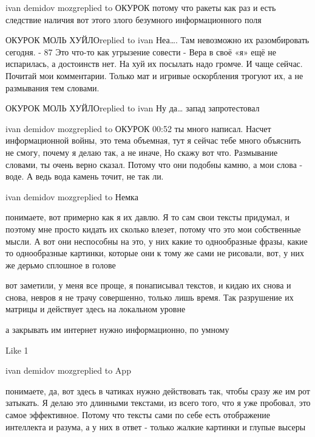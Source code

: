 ivan demidov mozgreplied to ОКУРОК
потому что ракеты как раз и есть следствие наличия вот этого злого безумного информационного поля

ОКУРОК МОЛЬ ХУЙЛОreplied to ivan
Неа…. Там невозможно их разомбировать сегодня. - 87%
Это что-то как угрызение совести - Вера в своё «я» ещё не испарилась, а достоинств нет.
На хуй их посылать надо громче. И чаще сейчас. Почитай мои комментарии. Только мат и игривые оскорбления трогуют их, а не размывания тем словами.

ОКУРОК МОЛЬ ХУЙЛОreplied to ivan
Ну да… запад запротестовал

ivan demidov mozgreplied to ОКУРОК
00:52
ты много написал. Насчет информационной войны, это тема объемная, тут я сейчас тебе много объяснить не смогу, почему я делаю так, а не иначе, Но скажу вот что. Размывание словами, ты очень верно сказал. Потому что они подобны камню, а мои слова - воде. А ведь вода камень точит, не так ли.

ivan demidov mozgreplied to Немка

понимаете, вот примерно как я их давлю. Я то сам свои тексты придумал, и
поэтому мне просто кидать их сколько влезет, потому что это мои собственные
мысли. А вот они неспособны на это, у них какие то однообразные фразы, какие то
однообразные картинки, которые они к тому же сами не рисовали, вот, у них же
дерьмо сплошное в голове

вот заметили, у меня все проще, я понаписывал текстов, и кидаю их снова и
снова, невров я не трачу совершенно, только лишь время. Так разрушение их
матрицы и действует здесь на локальном уровне

а закрывать им интернет нужно информационно, по умному

    Like 1

ivan demidov mozgreplied to App

понимаете, да, вот здесь в чатиках нужно действовать так, чтобы сразу же им рот
затыкать. Я делаю это длинными текстами, из всего того, что я уже пробовал, это
самое эффективное. Потому что тексты сами по себе есть отображение интеллекта и
разума, а у них в ответ - только жалкие картинки и глупые высеры

